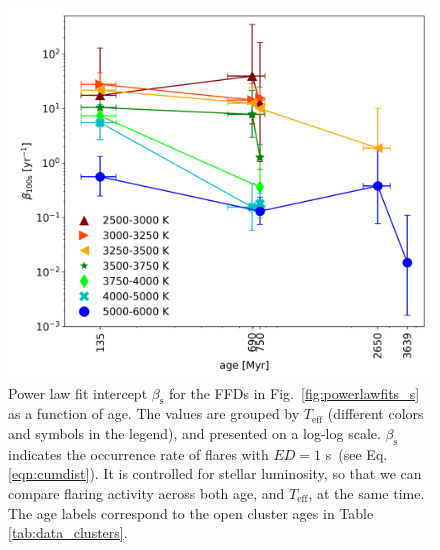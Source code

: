 \documentclass{aa}
\begin{document}
\begin{figure}[ht!]
    \centering
    \includegraphics[width=\hsize]{pics/FFDs/beta_T_age_ED_wheatland.png}
    \caption{Power law fit intercept $\beta_\mathrm{s}$ for the FFDs in Fig.~\ref{fig:powerlawfits_s} as a function of age. The values are grouped by $T_\mathrm{eff}$ (different colors and symbols in the legend), and presented on a log-log scale. $\beta_\mathrm{s}$ indicates the occurrence rate of flares with $ED=1$ s~(see Eq. \ref{eqn:cumdist}). It is controlled for stellar luminosity, so that we can compare flaring activity across both age, and $T_\mathrm{eff}$, at the same time. The age labels correspond to the open cluster ages in Table \ref{tab:data_clusters}.}    	
    \label{fig:beta_T_age}
\end{figure}
\end{document}
